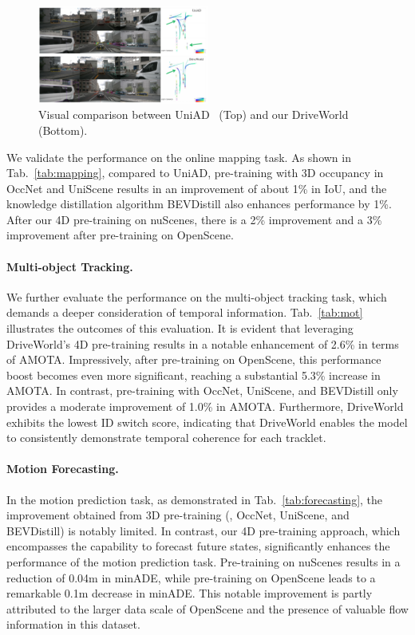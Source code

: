 \begin{figure}[t]
	\centering
	\includegraphics[width=0.5\textwidth]{figures/results} 
	\caption{Visual comparison between UniAD~\cite{uniad} (Top) and our DriveWorld (Bottom).}
	\label{fig:compare}
\end{figure}
We validate the performance on the online mapping task. As shown in Tab.~\ref{tab:mapping}, compared to UniAD, pre-training with 3D occupancy in OccNet and UniScene results in an improvement of about 1\% in IoU, and the knowledge distillation algorithm BEVDistill also enhances performance by 1\%. After our 4D pre-training on nuScenes, there is a 2\% improvement and a 3\% improvement after pre-training on OpenScene.
\paragraph{Multi-object Tracking.}
We further evaluate the performance on the multi-object tracking task, which demands a deeper consideration of temporal information. Tab.~\ref{tab:mot} illustrates the outcomes of this evaluation. It is evident that leveraging DriveWorld's 4D pre-training results in a notable enhancement of 2.6\% in terms of AMOTA. Impressively, after pre-training on OpenScene, this performance boost becomes even more significant, reaching a substantial 5.3\% increase in AMOTA. In contrast, pre-training with OccNet, UniScene, and BEVDistill only provides a moderate improvement of 1.0\% in AMOTA. Furthermore, DriveWorld exhibits the lowest ID switch score, indicating that DriveWorld enables the model to consistently demonstrate temporal coherence for each tracklet.
\paragraph{Motion Forecasting.}
In the motion prediction task, as demonstrated in Tab.~\ref{tab:forecasting}, the improvement obtained from 3D pre-training (\eg, OccNet, UniScene, and BEVDistill) is notably limited. In contrast, our 4D pre-training approach, which encompasses the capability to forecast future states, significantly enhances the performance of the motion prediction task. Pre-training on nuScenes results in a reduction of 0.04m in minADE, while pre-training on OpenScene leads to a remarkable 0.1m decrease in minADE. This notable improvement is partly attributed to the larger data scale of OpenScene and the presence of valuable flow information in this dataset. 
